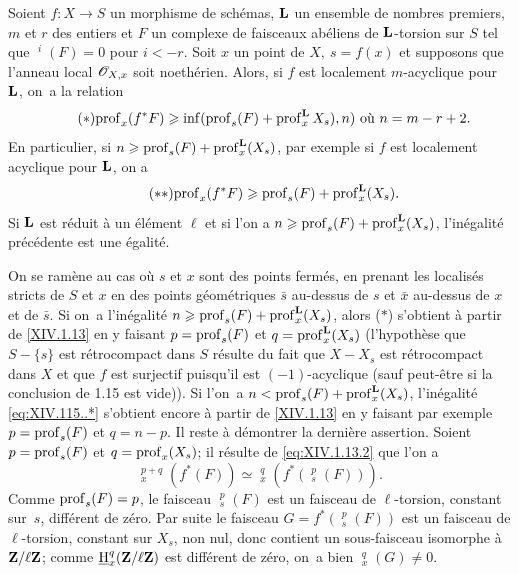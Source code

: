 \begin{corollaire} \label{XIV.1.15}
Soient $f:X\to S$ un morphisme de sch\'emas, $\mathbf{L}$ un ensemble de nombres premiers, $m$ et $r$ des entiers et $F$ un complexe de faisceaux ab\'eliens de $\mathbf{L}$-torsion sur $S$ tel que $\mathop{\underline{\mathrm{H}}}\nolimits^i(F)=0$ pour $i<-r$. Soit $x$ un point de $X,\ s=f(x)$ et supposons que l'anneau local ${\mathscr O}_{X, x}$ soit noeth\'erien. Alors, si $f$ est localement $m$-acyclique pour $\mathbf{L}$, on~a la relation
\begin{equation*} \label{eq:XIV.115..*} \tag{$*$} {\operatorname{prof}_x(f^*F)\geqslant\inf(\operatorname{prof}_s(F)+\operatorname{prof}^{\mathbf{L}}_xX_s), n)\text{ où }n=m-r+2.}
\end{equation*}
En particulier, si $n\geqslant\operatorname{prof}_s(F)+\operatorname{prof}_x^{\mathbf{L}}(X_s)$, par exemple si $f$ est localement acyclique pour $\mathbf{L}$, on a
\begin{equation*} \label{eq:XIV.15.**} \tag{$**$} {\operatorname{prof}_x(f^*F)\geqslant\operatorname{prof}_s(F)+\operatorname{prof}_x^{\mathbf{L}}(X_s).}
\end{equation*}
Si $\mathbf{L}$ est r\'eduit \`a un \'el\'ement $\ell$ et si l'on a $n\geqslant \operatorname{prof}_s(F)+\operatorname{prof}_x^{\mathbf{L}}(X_s)$, l'in\'egalit\'e pr\'ec\'edente est une \'egalit\'e.
\end{corollaire}

On se ram\`ene au cas o\`u $s$ et $x$ sont des points ferm\'es, en prenant les localis\'es stricts de $S$ et $x$ en des points g\'eom\'etriques $\bar s$ au-dessus de $s$ et $\bar x$ au-dessus de $x$ et de $\bar s$. Si on~a l'in\'egalit\'e $n\geqslant\operatorname{prof}_s(F)+\operatorname{prof}_x^{\mathbf{L}}(X_s)$, alors ($*$) s'obtient \`a partir de \ref{XIV.1.13} en y faisant $p=\operatorname{prof}_s(F)$ et $q=\operatorname{prof}_x^{\mathbf{L}}(X_s)$ (l'hypoth\`ese que $S-\{s\}$ est r\'etrocompact dans $S$ r\'esulte du fait que $X-X_s$ est r\'etrocompact dans $X$ et que $f$ est surjectif puisqu'il est $(-1)$-acyclique (sauf peut-\^etre si la conclusion de 1.15 est vide)). Si l'on~a $n<\operatorname{prof}_s(F)+\operatorname{prof}_x^{\mathbf{L}}(X_s)$, l'in\'egalit\'e \eqref{eq:XIV.115..*} s'obtient encore \`a partir de \ref{XIV.1.13} en y faisant par exemple $p=\operatorname{prof}_s(F)$ et $q=n-p$. Il reste \`a d\'emontrer la derni\`ere assertion. Soient $p=\operatorname{prof}_s(F)$ et $q=\operatorname{prof}_x(X_s)$; il r\'esulte de \eqref{eq:XIV.1.13.2} que l'on a
$$
\mathop{\underline{\mathrm{H}}}\nolimits_x^{p+q}(f^*(F))\simeq \mathop{\underline{\mathrm{H}}}\nolimits_x^q(f^*(\mathop{\underline{\mathrm{H}}}\nolimits^p_s(F))).
$$
Comme $\operatorname{prof}_s(F)=p$, le faisceau $\mathop{\underline{\mathrm{H}}}\nolimits^p_s(F)$ est un faisceau de $\ell$-torsion, constant sur~$s$, diff\'erent de z\'ero. Par suite le faisceau $G=f^*(\mathop{\underline{\mathrm{H}}}\nolimits_s^p(F))$ est un faisceau de $\ell$-torsion, constant sur $X_s$, non nul, donc contient un sous-faisceau isomorphe \`a $\mathbf{Z}/\ell\mathbf{Z}$; comme $\mathop{\underline{\mathrm{H}}}\nolimits_x^q(\mathbf{Z}/\ell\mathbf{Z})$ est diff\'erent de z\'ero, on~a bien $\mathop{\underline{\mathrm{H}}}\nolimits_x^q(G)\neq 0$.

